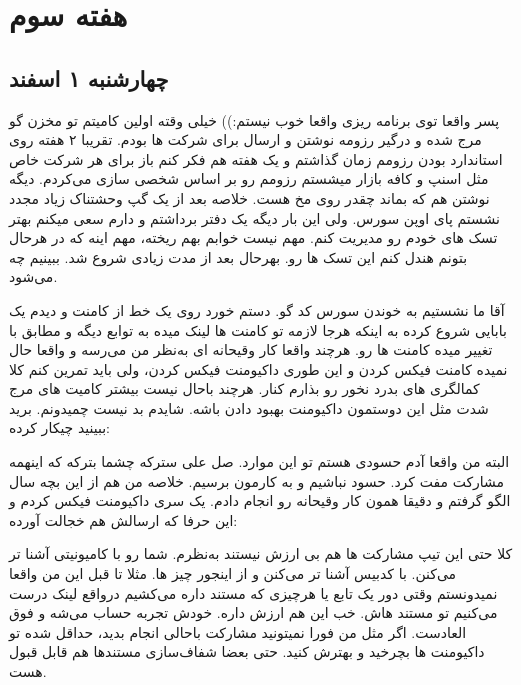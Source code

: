 \section{هفته سوم}
\subsection{چهارشنبه ۱ اسفند}
پسر واقعا توی برنامه ریزی واقعا خوب نیستم:)) خیلی وقته اولین کامیتم تو مخزن گو مرج شده و درگیر رزومه نوشتن و ارسال
برای شرکت ها بودم. تقریبا ۲ هفته روی استاندارد بودن رزومم زمان گذاشتم و یک هفته هم فکر کنم باز برای هر شرکت خاص مثل اسنپ
و کافه بازار میشستم رزومم رو بر اساس  شخصی سازی می‌کردم. دیگه  نوشتن هم که بماند چقدر
روی مخ هست. خلاصه بعد از یک گپ وحشتناک زیاد مجدد نشستم پای اوپن سورس. ولی این بار دیگه یک دفتر برداشتم و دارم سعی میکنم
بهتر تسک های خودم رو مدیریت کنم. مهم نیست خوابم بهم ریخته، مهم اینه که در هرحال بتونم هندل کنم این تسک ها رو. بهرحال بعد
از مدت زیادی شروع شد. ببینیم چه می‌شود.

آقا ما نشستیم به خوندن سورس کد گو. دستم خورد روی یک خط از کامنت و دیدم یک بابایی شروع کرده به اینکه هرجا لازمه تو کامنت ها
لینک میده به توابع دیگه و مطابق با  تغییر میده کامنت ها رو. هرچند واقعا کار وقیحانه ای به‌نظر من می‌رسه و واقعا حال نمیده
کامنت فیکس کردن و این طوری داکیومنت فیکس کردن، ولی باید تمرین کنم کلا کمالگری های بدرد نخور رو بذارم کنار. هرچند باحال نیست
بیشتر کامیت های مرج شدت مثل این دوستمون داکیومنت بهبود دادن باشه. شایدم بد نیست چمیدونم. برید ببینید چیکار کرده:


البته من واقعا آدم حسودی هستم تو این موارد. صل علی سترکه چشما  بترکه که اینهمه مشارکت مفت کرد.
حسود نباشیم و به کارمون برسیم. خلاصه من هم از این بچه سال الگو گرفتم و دقیقا همون کار وقیحانه رو انجام دادم.
یک سری داکیومنت فیکس کردم و این حرفا که ارسالش هم خجالت آورده:


کلا حتی این تیپ مشارکت ها هم بی ارزش نیستند به‌نظرم. شما رو با کامیونیتی آشنا تر می‌کنن. با کدبیس آشنا تر می‌کنن
و از اینجور چیز ها. مثلا تا قبل این من واقعا نمیدونستم وقتی دور یک تابع یا هرچیزی که مستند  داره 
می‌کشیم درواقع لینک درست می‌کنیم تو مستند هاش. خب این هم ارزش داره. خودش تجربه حساب می‌شه و فوق العادست.
اگر مثل من فورا نمیتونید مشارکت باحالی انجام بدید، حداقل شده تو داکیومنت ها بچرخید و بهترش کنید. حتی بعضا شفاف‌سازی
مستندها هم قابل قبول هست.

